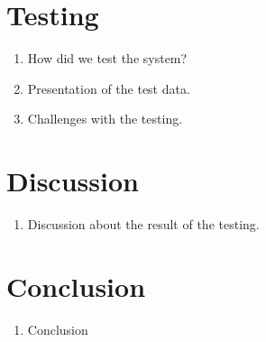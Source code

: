 \documentclass[../Main/thesis.tex]{subfiles}
\begin{document}
\section*{Testing}
\begin{enumerate}
	\item How did we test the system?
	\item Presentation of the test data.
	\item Challenges with the testing.
\end{enumerate}

\section*{Discussion}
\begin{enumerate}
	\item Discussion about the result of the testing. 
\end{enumerate}

\section*{Conclusion}
\begin{enumerate}
	\item Conclusion
\end{enumerate}
\end{document}
